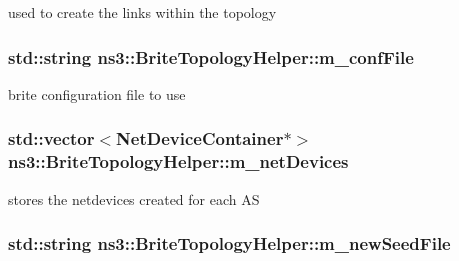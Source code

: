 used to create the links within the topology 

\subsubsection[{\texorpdfstring{m\+\_\+conf\+File}{m_confFile}}]{\setlength{\rightskip}{0pt plus 5cm}std\+::string ns3\+::\+Brite\+Topology\+Helper\+::m\+\_\+conf\+File\hspace{0.3cm}{\ttfamily [private]}}\hypertarget{classns3_1_1BriteTopologyHelper_afd010e3caf23ed73ec9ff395bcc9a490}{}\label{classns3_1_1BriteTopologyHelper_afd010e3caf23ed73ec9ff395bcc9a490}


brite configuration file to use 

\subsubsection[{\texorpdfstring{m\+\_\+net\+Devices}{m_netDevices}}]{\setlength{\rightskip}{0pt plus 5cm}std\+::vector$<${\bf Net\+Device\+Container}$\ast$$>$ ns3\+::\+Brite\+Topology\+Helper\+::m\+\_\+net\+Devices\hspace{0.3cm}{\ttfamily [private]}}\hypertarget{classns3_1_1BriteTopologyHelper_a2a59c91c1acf2cc6bb2742d512f570ef}{}\label{classns3_1_1BriteTopologyHelper_a2a59c91c1acf2cc6bb2742d512f570ef}


stores the netdevices created for each AS 

\subsubsection[{\texorpdfstring{m\+\_\+new\+Seed\+File}{m_newSeedFile}}]{\setlength{\rightskip}{0pt plus 5cm}std\+::string ns3\+::\+Brite\+Topology\+Helper\+::m\+\_\+new\+Seed\+File\hspace{0.3cm}{\ttfamily [private]}}\hypertarget{classns3_1_1BriteTopologyHelper_a80192540d402eb7b3f168e1b7e49915a}{}\label{classns3_1_1BriteTopologyHelper_a80192540d402eb7b3f168e1b7e49915a}



